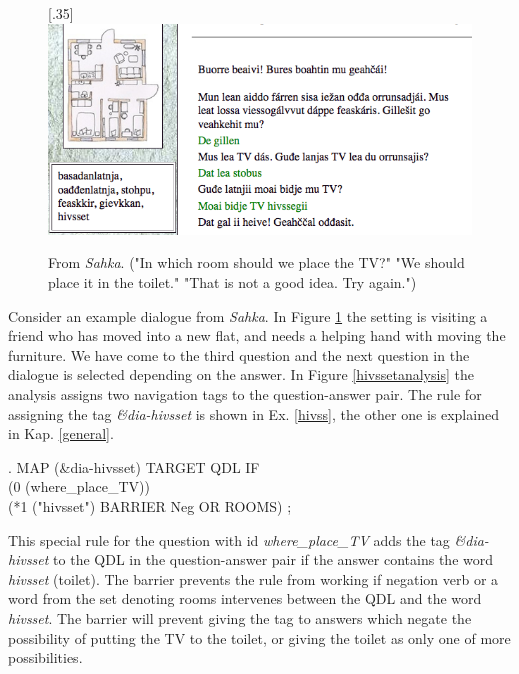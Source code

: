 \documentclass[11pt]{article}
\begin{document}
\begin{figure}[htbp]
\begin{center}
\scalebox{.35}[.35]{\includegraphics{presentation/img/TVhivssegii.png}}\\
\caption{From \textit{Sahka}. ("In which room should we place the TV?" "We should place it in the toilet." "That is not a good idea. Try again.")
}
\label{sahka}
\end{center}
\end{figure}


Consider an example dialogue from \textit{Sahka}. In Figure \ref{sahka} the setting is visiting a friend who has moved into a new flat, and needs a helping hand with moving the furniture. We have come to the third question and the next question in the dialogue is selected depending on the answer. In Figure \ref{hivssetanalysis} the analysis assigns two navigation tags to the question-answer pair. The rule for assigning the tag \textit{\&dia-hivsset} is shown in Ex. \ref{hivss}, the other one is explained in Kap. \ref{general}.

\ex.\flushleft \label{hivss} \small MAP (\&dia-hivsset) TARGET QDL IF \\
     (0 (where\_place\_TV))\\(*1 ("hivsset") BARRIER Neg OR ROOMS) ;

This special rule for the question with id \textit{where\_place\_TV} adds the tag \textit{\&dia-hivsset} to the QDL in the question-answer pair if the answer contains the word \textit{hivsset} (toilet). The barrier prevents the rule from working if negation verb or a word from the set denoting rooms intervenes between the QDL and the word \textit{hivsset}. The barrier will prevent giving the tag to answers which negate the possibility of putting the TV to the toilet, or giving the toilet as only one of more possibilities. \\
\end{document}
